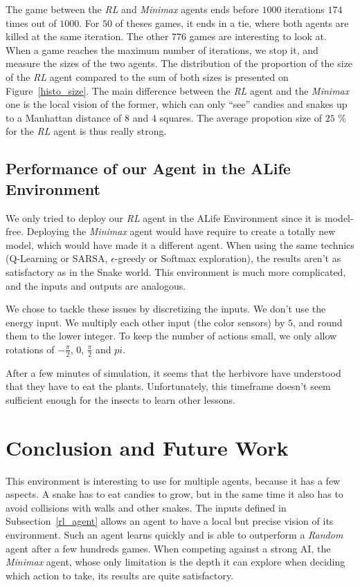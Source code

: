 \documentclass[journal, a4paper]{IEEEtran}
\begin{document}
The game between the \emph{RL} and \emph{Minimax} agents ends before $1000$ iterations $174$ times out of $1000$.
For $50$ of theses games, it ends in a tie, where both agents are killed at the same iteration.
The other $776$ games are interesting to look at.
When a game reaches the maximum number of iterations, we stop it, and measure the sizes of the two agents.
The distribution of the proportion of the size of the \emph{RL} agent compared to the sum of both sizes is presented on Figure~\ref{histo_size}.
The main difference between the \emph{RL} agent and the \emph{Minimax} one is the local vision of the former, which can only ``see'' candies and snakes up to a Manhattan distance of $8$ and $4$ squares.
The average propotion size of $25$ \% for the \emph{RL} agent is thus really strong.

\subsection{Performance of our Agent in the ALife Environment}

We only tried to deploy our \emph{RL} agent in the ALife Environment since it is model-free.
Deploying the \emph{Minimax} agent would have require to create a totally new model, which would have made it a different agent.
When using the same technics (Q-Learning or SARSA, $\epsilon$-greedy or Softmax exploration), the results aren't as satisfactory as in the Snake world.
This environment is much more complicated, and the inputs and outputs are analogous.

We chose to tackle these issues by discretizing the inputs.
We don't use the energy input.
We multiply each other input (the color sensors) by $5$, and round them to the lower integer.
To keep the number of actions small, we only allow rotations of $-\frac{\pi}{2}$, $0$, $\frac{\pi}{2}$ and $pi$.

After a few minutes of simulation, it seems that the herbivore have understood that they have to eat the plants.
Unfortunately, this timeframe doesn't seem sufficient enough for the insects to learn other lessons.

\section{Conclusion and Future Work}
    This environment is interesting to use for multiple agents, because it has a few aspects.
    A snake has to eat candies to grow, but in the same time it also has to avoid collisions with walls and other snakes.
    The inputs defined in Subsection~\ref{rl_agent} allows an agent to have a local but precise vision of its environment.
    Such an agent learns quickly and is able to outperform a \emph{Random} agent after a few hundreds games.
    When competing against a strong AI, the \emph{Minimax} agent, whose only limitation is the depth it can explore when deciding which action to take, its results are quite satisfactory.
\end{document}
